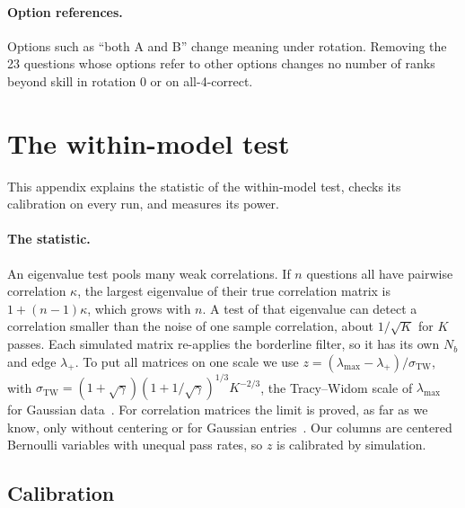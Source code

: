 \documentclass{article}
\theoremstyle{plain}
\theoremstyle{remark}
\begin{document}
\paragraph{Option references.} Options such as ``both A and B'' change
meaning under rotation. Removing the 23 questions whose options refer to
other options changes no number of ranks beyond skill in
rotation 0 or on all-4-correct.

\section{The within-model test}
\label{app:within}

This appendix explains the statistic of the within-model test, checks
its calibration on every run, and measures its power.

\paragraph{The statistic.} An eigenvalue test pools many weak
correlations. If $n$ questions all have pairwise correlation $\kappa$,
the largest eigenvalue of their true correlation matrix is
$1+(n-1)\kappa$, which grows with $n$. A test of that eigenvalue can detect a correlation smaller than the noise of one sample
correlation, about $1/\sqrt{K}$ for $K$ passes. Each simulated matrix
re-applies the borderline filter, so it has its own $N_b$ and edge
$\lambda_+$. To put all matrices on one scale we use
$z=(\lambda_{\max}-\lambda_+)/\sigma_{\mathrm{TW}}$, with
$\sigma_{\mathrm{TW}}=(1+\sqrt\gamma)(1+1/\sqrt\gamma)^{1/3}K^{-2/3}$,
the Tracy--Widom scale of $\lambda_{\max}$ for Gaussian
data~\citep{johnstone2001}. For correlation matrices the limit is
proved, as far as we know, only without centering or for Gaussian
entries~\citep{baopanzhou2012,pillaiyin2012}. Our columns are centered
Bernoulli variables with unequal pass rates, so $z$ is calibrated by simulation.

\subsection{Calibration}
\label{app:stats}
\end{document}
